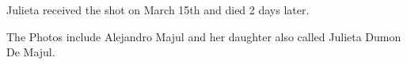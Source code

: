 Julieta received the shot on March 15th and died 2 days later.

The Photos include Alejandro Majul and her daughter also called Julieta Dumon De
Majul.

